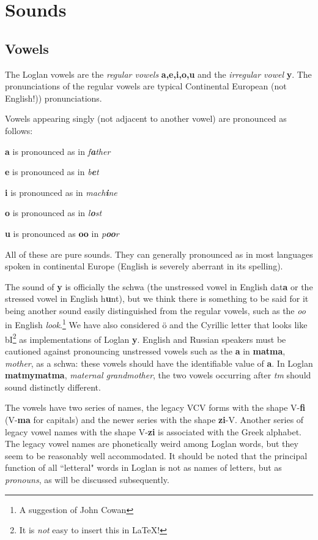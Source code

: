 \documentclass[12pt]{book}
\begin{document}
\section{Sounds}

\subsection{Vowels}

The Loglan vowels are the {\em regular vowels} {\bf a,e,i,o,u} and the {\em irregular vowel} {\bf y}.  The pronunciations of the regular vowels are typical Continental European (not English!)) pronunciations.

Vowels appearing singly (not adjacent to another vowel) are pronounced as follows:

{\bf a} is pronounced as in {\em f{\bf a}ther\/}

{\bf e} is pronounced as in {\em b{\bf e}t\/}

{\bf i} is pronounced as in {\em mach{\bf i}ne\/}

{\bf o} is pronounced as in {\em l{\bf o}st\/}

{\bf u} is pronounced as {\bf oo} in {\em p{\bf oo}r}

All of these are pure sounds.   They can generally pronounced as  in most languages spoken in continental Europe (English is severely aberrant in its spelling).

  The sound of {\bf y} is officially the schwa (the unstressed vowel in English dat{\bf a} or the stressed vowel in English h{\bf u}nt), but we think there is something to be said for it being another sound easily distinguished from the regular vowels, such as the {\em oo} in English {\em look}.\footnote{A suggestion of John Cowan}  We have also considered \"o and the Cyrillic letter that looks like bI\footnote{It is {\em not\/} easy to insert this in LaTeX!} as implementations of Loglan {\bf y}.  English and Russian speakers must be cautioned against pronouncing unstressed vowels such as the
{\bf a} in {\bf matma}, {\em mother\/}, as a schwa:  these vowels should have the identifiable value of {\bf a}.  In Loglan {\bf matmymatma}, {\em maternal grandmother\/}, the two vowels occurring after {\em tm} should sound distinctly different.

The vowels have two series of names, the legacy VCV forms with the shape V-{\bf fi} (V-{\bf ma} for capitals) and the newer series with the shape {\bf zi}-V.  Another series of legacy vowel names with the shape V-{\bf zi} is associated with the Greek alphabet.  The legacy vowel names are phonetically weird among Loglan words, but they seem to be reasonably well accommodated.  It should be noted that the principal function of all ``letteral" words in Loglan is not as names of letters, but as {\em pronouns\/}, as will be discussed subsequently.
\end{document}
